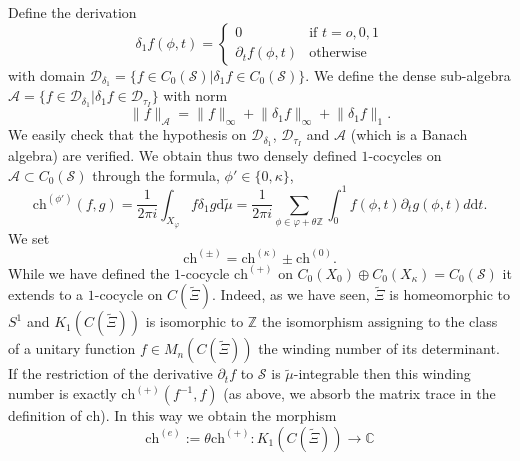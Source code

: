 \documentclass[11pt]{amsart}
\newcommand{\Z}{\mathbb{Z}}
\newcommand{\C}{\mathbb{C}}
\newcommand{\cut}{\kappa}
\newcommand{\che}{\text{ch}^{(e)}}
\begin{document}
Define the derivation
$$\delta_1 f(\phi,t) = 
\left\{\begin{array}{ll} 
	0 & \mbox{if } t=o,0,1 \\
	\partial_t f(\phi,t) &
	\mbox{otherwise}
\end{array}\right.$$
with domain $\mathcal{D}_{\delta_1}=\{f\in C_0(\mathcal S)|\delta_1 f \in C_0(\mathcal S)\}$. We define the dense sub-algebra $\mathcal{A}=\{f\in \mathcal{D}_{\delta_1}|{\delta_1}f\in \mathcal{D}_{\tau_I}\}$ with norm 
$$\lVert f\rVert_\mathcal{A}= \lVert f\rVert_\infty +\lVert \delta_1f\rVert_\infty+\lVert \delta_1f\rVert_1.$$
We easily check that the hypothesis on $\mathcal{D}_{\delta_1}$, $\mathcal{D}_{\tau_I}$ and $\mathcal{A}$ (which is a Banach algebra) are verified. We obtain thus two densely defined $1$-cocycles on $\mathcal A\subset C_0(\mathcal S)$ 
through the formula, $\phi' \in \{0,\cut\}$,
$$ \mathrm{ch}^{(\phi')}(f,g) = \frac1{2\pi i} \int_{X_\varphi} f\delta_1 g \mathrm{d}\tilde\mu = \frac1{2\pi i} \sum_{\phi\in \varphi+\theta\Z} \int_{0}^1 f(\phi,t)
\partial_t g(\phi,t) d\mathrm{d}t.$$
We set
$$\mathrm{ch}^{(\pm)}=\mathrm{ch}^{(\cut)}\pm\mathrm{ch}^{(0)}.$$
While we have defined the $1$-cocycle $\mathrm{ch}^{(+)}$ on $C_0(X_0)\oplus C_0(X_{\cut})= C_0(\mathcal S)$ it extends to a $1$-cocycle on $C(\tilde\Xi)$. Indeed, as we have seen, $\tilde\Xi$ is homeomorphic to $S^1$ and $K_1(C(\tilde\Xi))$ is isomorphic to $\Z$ the  isomorphism assigning to the class of a unitary function $f\in M_n(C(\tilde\Xi))$ the winding number of its determinant. If the restriction of the derivative $\partial_t f$ to $\mathcal S$ is $\tilde\mu$-integrable then this winding number is exactly $\mathrm{ch}^{(+)}(f^{-1}, f)$ (as above, we absorb the matrix trace in the definition of $\mathrm{ch}$). In this way we obtain the morphism 
\begin{equation}%
\che:=\theta \mathrm{ch}^{(+)}:K_1(C(\tilde\Xi))\to \C
\end{equation}
\end{document}
